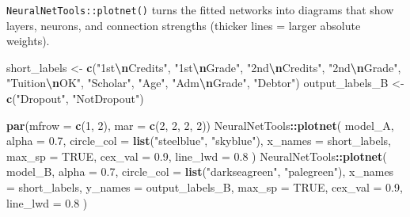 \documentclass[
]{article}
\newenvironment{Shaded}{\begin{snugshade}}{\end{snugshade}}
\newcommand{\AttributeTok}[1]{\textcolor[rgb]{0.13,0.29,0.53}{#1}}
\newcommand{\ConstantTok}[1]{\textcolor[rgb]{0.56,0.35,0.01}{#1}}
\newcommand{\DecValTok}[1]{\textcolor[rgb]{0.00,0.00,0.81}{#1}}
\newcommand{\FloatTok}[1]{\textcolor[rgb]{0.00,0.00,0.81}{#1}}
\newcommand{\FunctionTok}[1]{\textcolor[rgb]{0.13,0.29,0.53}{\textbf{#1}}}
\newcommand{\NormalTok}[1]{#1}
\newcommand{\OtherTok}[1]{\textcolor[rgb]{0.56,0.35,0.01}{#1}}
\newcommand{\SpecialCharTok}[1]{\textcolor[rgb]{0.81,0.36,0.00}{\textbf{#1}}}
\newcommand{\StringTok}[1]{\textcolor[rgb]{0.31,0.60,0.02}{#1}}
\begin{document}
\texttt{NeuralNetTools::plotnet()} turns the fitted networks into
diagrams that show layers, neurons, and connection strengths (thicker
lines = larger absolute weights).

\begin{Shaded}
\begin{Highlighting}[]
\NormalTok{short\_labels }\OtherTok{\textless{}{-}} \FunctionTok{c}\NormalTok{(}\StringTok{"1st}\SpecialCharTok{\textbackslash{}n}\StringTok{Credits"}\NormalTok{, }\StringTok{"1st}\SpecialCharTok{\textbackslash{}n}\StringTok{Grade"}\NormalTok{, }\StringTok{"2nd}\SpecialCharTok{\textbackslash{}n}\StringTok{Credits"}\NormalTok{, }\StringTok{"2nd}\SpecialCharTok{\textbackslash{}n}\StringTok{Grade"}\NormalTok{,}
                  \StringTok{"Tuition}\SpecialCharTok{\textbackslash{}n}\StringTok{OK"}\NormalTok{, }\StringTok{"Scholar"}\NormalTok{, }\StringTok{"Age"}\NormalTok{, }\StringTok{"Adm}\SpecialCharTok{\textbackslash{}n}\StringTok{Grade"}\NormalTok{, }\StringTok{"Debtor"}\NormalTok{)}
\NormalTok{output\_labels\_B }\OtherTok{\textless{}{-}} \FunctionTok{c}\NormalTok{(}\StringTok{"Dropout"}\NormalTok{, }\StringTok{"NotDropout"}\NormalTok{)}

\FunctionTok{par}\NormalTok{(}\AttributeTok{mfrow =} \FunctionTok{c}\NormalTok{(}\DecValTok{1}\NormalTok{, }\DecValTok{2}\NormalTok{), }\AttributeTok{mar =} \FunctionTok{c}\NormalTok{(}\DecValTok{2}\NormalTok{, }\DecValTok{2}\NormalTok{, }\DecValTok{2}\NormalTok{, }\DecValTok{2}\NormalTok{))}
\NormalTok{NeuralNetTools}\SpecialCharTok{::}\FunctionTok{plotnet}\NormalTok{(}
\NormalTok{  model\_A,}
  \AttributeTok{alpha =} \FloatTok{0.7}\NormalTok{,}
  \AttributeTok{circle\_col =} \FunctionTok{list}\NormalTok{(}\StringTok{"steelblue"}\NormalTok{, }\StringTok{"skyblue"}\NormalTok{),}
  \AttributeTok{x\_names =}\NormalTok{ short\_labels,}
  \AttributeTok{max\_sp =} \ConstantTok{TRUE}\NormalTok{,}
  \AttributeTok{cex\_val =} \FloatTok{0.9}\NormalTok{,}
  \AttributeTok{line\_lwd =} \FloatTok{0.8}
\NormalTok{)}
\NormalTok{NeuralNetTools}\SpecialCharTok{::}\FunctionTok{plotnet}\NormalTok{(}
\NormalTok{  model\_B,}
  \AttributeTok{alpha =} \FloatTok{0.7}\NormalTok{,}
  \AttributeTok{circle\_col =} \FunctionTok{list}\NormalTok{(}\StringTok{"darkseagreen"}\NormalTok{, }\StringTok{"palegreen"}\NormalTok{),}
  \AttributeTok{x\_names =}\NormalTok{ short\_labels,}
  \AttributeTok{y\_names =}\NormalTok{ output\_labels\_B,}
  \AttributeTok{max\_sp =} \ConstantTok{TRUE}\NormalTok{,}
  \AttributeTok{cex\_val =} \FloatTok{0.9}\NormalTok{,}
  \AttributeTok{line\_lwd =} \FloatTok{0.8}
\NormalTok{)}
\end{Highlighting}
\end{Shaded}
\end{document}
